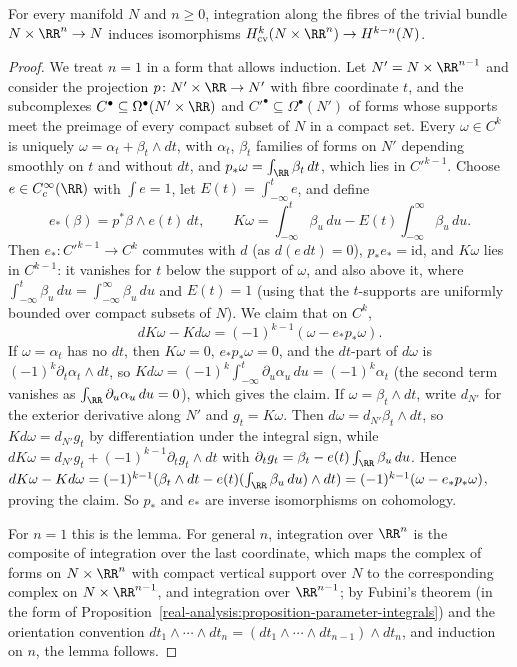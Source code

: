 \begin{lemma}\label{characteristic-classes:lemma-thom-trivial}
For every manifold $N$ and $n \geq 0$, integration along the fibres of the trivial bundle $N \times \RR^n \to N$ induces isomorphisms $H^k_{\mathrm{cv}}(N \times \RR^n) \to H^{k-n}(N)$.
\end{lemma}

\begin{proof}
We treat $n = 1$ in a form that allows induction. Let $N' = N \times \RR^{n-1}$ and consider the projection $p \colon N' \times \RR \to N'$ with fibre coordinate $t$, and the subcomplexes $C^\bullet \subseteq \Omega^\bullet(N' \times \RR)$ and
$C'^\bullet \subseteq \Omega^\bullet(N')$ of forms whose supports meet the preimage of every compact subset of $N$ in a compact set. Every $\omega \in C^k$ is uniquely $\omega = \alpha_t + \beta_t \wedge dt$, with $\alpha_t$, $\beta_t$ families of
forms on $N'$ depending smoothly on $t$ and without $dt$, and $p_*\omega = \int_\RR\beta_t\,dt$, which lies in $C'^{k-1}$. Choose $e \in C^\infty_c(\RR)$ with $\int e = 1$, let $E(t) = \int_{-\infty}^te$, and define
\[
e_*(\beta) = p^*\beta \wedge e(t)\,dt, \qquad K\omega = \int_{-\infty}^t\beta_u\,du - E(t)\int_{-\infty}^\infty\beta_u\,du.
\]
Then $e_* \colon C'^{k-1} \to C^k$ commutes with $d$ (as $d(e\,dt) = 0$), $p_*e_* = \mathrm{id}$, and $K\omega$ lies in $C^{k-1}$: it vanishes for $t$ below the support of $\omega$, and also above it, where $\int_{-\infty}^t\beta_u\,du = \int_{-\infty}^\infty\beta_u\,du$
and $E(t) = 1$ (using that the $t$-supports are uniformly bounded over compact subsets of $N$). We claim that on $C^k$,
\[
dK\omega - Kd\omega = (-1)^{k-1}(\omega - e_*p_*\omega).
\]
If $\omega = \alpha_t$ has no $dt$, then $K\omega = 0$, $e_*p_*\omega = 0$, and the $dt$-part of $d\omega$ is $(-1)^k\partial_t\alpha_t \wedge dt$, so $Kd\omega = (-1)^k\int_{-\infty}^t\partial_u\alpha_u\,du = (-1)^k\alpha_t$ (the second term vanishes as
$\int_\RR\partial_u\alpha_u\,du = 0$), which gives the claim. If $\omega = \beta_t \wedge dt$, write $d_{N'}$ for the exterior derivative along $N'$ and $g_t = K\omega$. Then $d\omega = d_{N'}\beta_t \wedge dt$, so
$Kd\omega = d_{N'}g_t$ by differentiation under the integral sign, while $dK\omega = d_{N'}g_t + (-1)^{k-1}\partial_tg_t \wedge dt$ with $\partial_tg_t = \beta_t - e(t)\int_\RR\beta_u\,du$. Hence
$dK\omega - Kd\omega = (-1)^{k-1}(\beta_t \wedge dt - e(t)(\int_\RR\beta_u\,du) \wedge dt) = (-1)^{k-1}(\omega - e_*p_*\omega)$, proving the claim. So $p_*$ and $e_*$ are inverse isomorphisms on cohomology.

For $n = 1$ this is the lemma. For general $n$, integration over $\RR^n$ is the composite of integration over the last coordinate, which maps the complex of forms on $N \times \RR^n$ with compact vertical support over $N$ to
the corresponding complex on $N \times \RR^{n-1}$, and integration over $\RR^{n-1}$; by Fubini's theorem (in the form of Proposition~\ref{real-analysis:proposition-parameter-integrals}) and the orientation convention
$dt_1 \wedge \cdots \wedge dt_n = (dt_1 \wedge \cdots \wedge dt_{n-1}) \wedge dt_n$, and induction on $n$, the lemma follows.
\end{proof}

